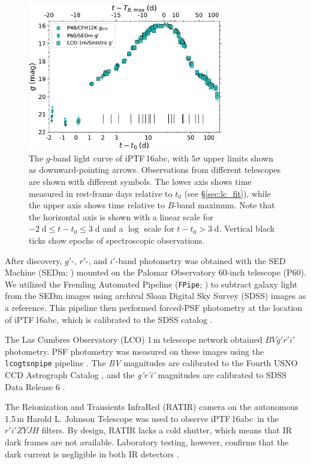 \documentclass[twocolumn]{aastex61}
\newcommand{\abc}{iPTF\,16abc}
\begin{document}
\begin{figure}[htb] 
    \centering
    \includegraphics[width=3.35in]{logLC_with_colors.pdf} 
    \caption{
    The $g$-band light curve of \abc, with $5\sigma$ upper limits shown as
    downward-pointing arrows. Observations from different telescopes are
    shown with different symbols. The lower axis shows time measured in
    rest-frame days relative to $t_0$ (see \S\ref{sec:lc_fit}), while the
    upper axis shows time relative to $B$-band maximum. Note that the
    horizontal axis is shown with a linear scale for $-2 \; \mathrm{d} \le t
    - t_0 \le 3 \; \mathrm{d}$ and a $\log$ scale for $t - t_0 > 3 \;
    \mathrm{d}$. Vertical black ticks show epochs of spectroscopic
    observations. }
% 
    \label{fig:lightcurve} 
\end{figure}

After discovery, $g'$-, $r'$-, and $i'$-band photometry was obtained with
the SED Machine (SEDm; \citealt{2017arXiv171002917B}) mounted on the Palomar
Observatory 60-inch telescope (P60). We utilized the Fremling Automated
Pipeline (\texttt{FPipe}; \citealt{2016A&A...593A..68F}) to subtract galaxy
light from the SEDm images using archival Sloan Digital Sky Survey (SDSS)
images as a reference. This pipeline then performed forced-PSF photometry at
the location of \abc, which is calibrated to the SDSS catalog
\citep{2014ApJS..211...17A}.

The Las Cumbres Observatory (LCO) 1\,m telescope network obtained $BVg'r'i'$
photometry. PSF photometry was measured on these images using the
\texttt{lcogtsnpipe} pipeline \citep{2016MNRAS.459.3939V}. The \textit{BV}
magnitudes are calibrated to the Fourth USNO CCD Astrograph Catalog
\citep{2013AJ....145...44Z}, and the \textit{g'r'i'} magnitudes are
calibrated to SDSS Data Release 6 \citep{2008ApJS..175..297A}.

The Reionization and Transients InfraRed (RATIR) camera on the autonomous
1.5\,m Harold L. Johnson Telescope
\citep{2012SPIE.8446E..10B,2012SPIE.8444E..5LW} was used to observe \abc\ in
the $r'i'ZYJH$ filters. By design, RATIR lacks a cold shutter, which means
that IR dark frames are not available. Laboratory testing, however, confirms
that the dark current is negligible in both IR detectors
\citep{2012SPIE.8453E..1OF}.
\end{document}

